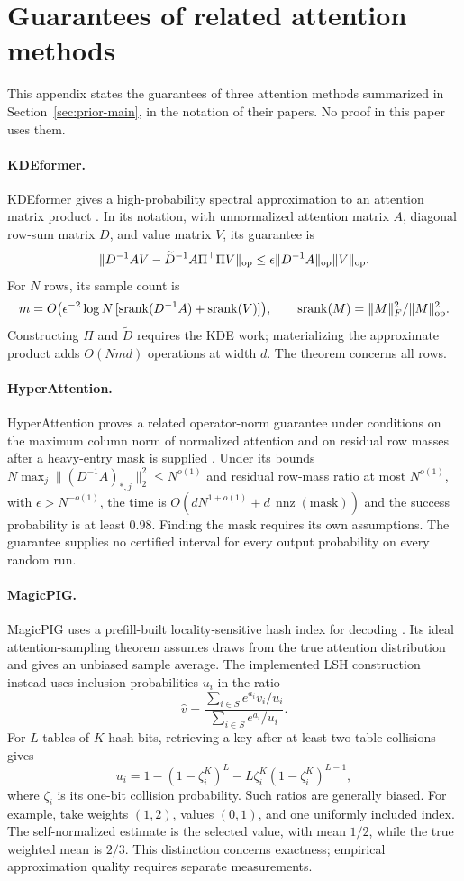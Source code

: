 \section{Guarantees of related attention methods}
\label{app:related}

This appendix states the guarantees of three attention methods
summarized in Section~\ref{sec:prior-main}, in the notation of their
papers. No proof in this paper uses them.

\paragraph{KDEformer.}
KDEformer gives a high-probability spectral approximation to an
attention matrix product \cite{kdeformer2023}. In its notation,
with unnormalized attention matrix $A$, diagonal row-sum matrix
$D$, and value matrix $V$, its guarantee is
\[
 \|D^{-1}AV-\widetilde D^{-1}A\Pi^\top\Pi V\|_{\rm op}
 \le \epsilon\|D^{-1}A\|_{\rm op}\|V\|_{\rm op}.
\]
For $N$ rows, its sample count is
\[
 m=O\bigl(\epsilon^{-2}\log N\,[\operatorname{srank}(D^{-1}A)
 +\operatorname{srank}(V)]\bigr),\qquad
 \operatorname{srank}(M)=\|M\|_F^2/\|M\|_{\rm op}^2.
\]
Constructing $\Pi$ and $\widetilde D$ requires the KDE work;
materializing the approximate product adds $O(Nmd)$ operations
at width $d$. The theorem concerns all rows.

\paragraph{HyperAttention.}
HyperAttention proves a related operator-norm guarantee under
conditions on the maximum column norm of normalized attention
and on residual row masses after a heavy-entry mask is supplied
\cite{hyperattention2023}. Under its bounds
$N\max_j\|(D^{-1}A)_{*,j}\|_2^2\le N^{o(1)}$ and
residual row-mass ratio at most $N^{o(1)}$, with
$\epsilon>N^{-o(1)}$, the time is
$O(dN^{1+o(1)}+d\,\operatorname{nnz}(\mathrm{mask}))$
and the success probability is at least $0.98$.
Finding the mask requires its own assumptions.
The guarantee supplies no certified interval for every output
probability on every random run.

\paragraph{MagicPIG.}
MagicPIG uses a prefill-built locality-sensitive hash index for
decoding \cite{magicpig2024}. Its ideal attention-sampling theorem
assumes draws from the true attention distribution and gives an
unbiased sample average. The implemented LSH construction instead
uses inclusion probabilities $u_i$ in the ratio
\[
 \widehat v=
 \frac{\sum_{i\in S}e^{a_i}v_i/u_i}
      {\sum_{i\in S}e^{a_i}/u_i}.
\]
For $L$ tables of $K$ hash bits, retrieving a key after at least
two table collisions gives
\[
 u_i=1-(1-\zeta_i^K)^L-L\zeta_i^K(1-\zeta_i^K)^{L-1},
\]
where $\zeta_i$ is its one-bit collision probability.
Such ratios are generally biased. For example, take
weights $(1,2)$, values $(0,1)$, and one uniformly included
index. The self-normalized estimate is the selected value, with
mean $1/2$, while the true weighted mean is $2/3$.
This distinction concerns exactness; empirical approximation
quality requires separate measurements.
